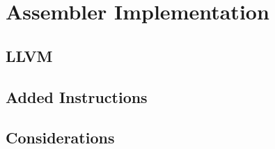 \chapter{Assembler Implementation}


\section{LLVM}

\section{Added Instructions}

\section{Considerations}

